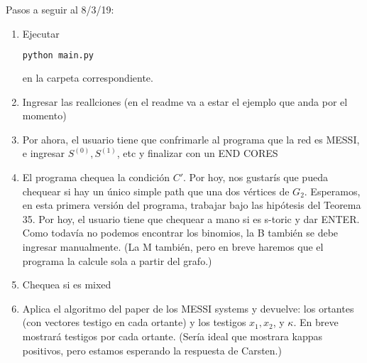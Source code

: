 \documentclass[10pt,a4paper]{report}
\begin{document}
Pasos a seguir al 8/3/19:

\begin{enumerate}


\item Ejecutar 

\begin{lstlisting}[language=bash]
python main.py
\end{lstlisting}

en la carpeta correspondiente.

\item Ingresar las reallciones (en el readme va a estar el ejemplo que anda por el momento)

\item Por ahora, el usuario tiene que confrimarle al programa que la red es MESSI, e ingresar $S^{(0)}, S^{(1)}$, etc y finalizar con un END CORES

\item El programa chequea la condición $C'$. Por hoy, nos gustarís que pueda chequear si hay un único simple path que una dos vértices de $G_2$. Esperamos, en esta primera versión del programa, trabajar bajo las hipótesis del Teorema 35.
  Por hoy, el usuario tiene que chequear a mano si es s-toric y dar ENTER. Como todavía no podemos encontrar los binomios, la B también se debe ingresar manualmente. (La M también, pero en breve haremos que el programa la calcule sola a partir del grafo.)

\item Chequea si es mixed

\item Aplica el algoritmo del paper de los MESSI systems y devuelve: los ortantes (con vectores testigo en cada ortante) y los testigos $x_1, x_2$, y $\kappa$. En breve mostrará testigos por cada ortante. (Sería ideal que mostrara kappas positivos, pero estamos esperando la respuesta de Carsten.)

\end{enumerate}
\end{document}
